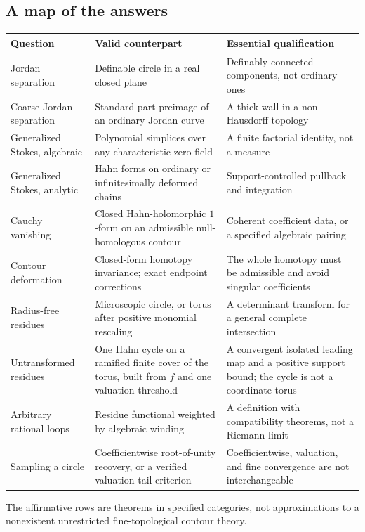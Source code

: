 \documentclass[11pt,letterpaper]{article}
\theoremstyle{definition}
\theoremstyle{remark}
\numberwithin{equation}{section}
\begin{document}
\subsection{A map of the answers}
\begin{center}\small
\begin{longtable}{@{}L{0.22\textwidth}L{0.38\textwidth}L{0.32\textwidth}@{}}
\toprule
Question & Valid counterpart & Essential qualification\\\midrule\endhead
Jordan separation & Definable circle in a real closed plane
  & Definably connected components, not ordinary ones\\[0.45em]
Coarse Jordan separation & Standard-part preimage of an ordinary Jordan curve
  & A thick wall in a non-Hausdorff topology\\[0.45em]
Generalized Stokes, algebraic & Polynomial simplices over any characteristic-zero
  field & A finite factorial identity, not a measure\\[0.45em]
Generalized Stokes, analytic & Hahn forms on ordinary or infinitesimally deformed
  chains & Support-controlled pullback and integration\\[0.45em]
Cauchy vanishing & Closed Hahn-holomorphic $1$-form on an admissible
  null-homologous contour & Coherent coefficient data, or a specified algebraic
  pairing\\[0.45em]
Contour deformation & Closed-form homotopy invariance; exact endpoint corrections
  & The whole homotopy must be admissible and avoid singular coefficients\\[0.45em]
Radius-free residues & Microscopic circle, or torus after positive monomial
  rescaling & A determinant transform for a general complete intersection\\[0.45em]
Untransformed residues & One Hahn cycle on a ramified finite cover of the torus,
  built from $f$ and one valuation threshold & A convergent isolated leading map
  and a positive support bound; the cycle is not a coordinate torus\\[0.45em]
Arbitrary rational loops & Residue functional weighted by algebraic winding
  & A definition with compatibility theorems, not a Riemann limit\\[0.45em]
Sampling a circle & Coefficientwise root-of-unity recovery, or a verified
  valuation-tail criterion & Coefficientwise, valuation, and fine convergence are
  not interchangeable\\
\bottomrule
\end{longtable}
\end{center}
The affirmative rows are theorems in specified categories, not approximations to a
nonexistent unrestricted fine-topological contour theory.
\end{document}
